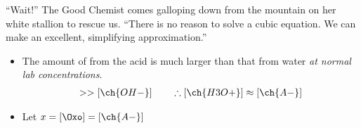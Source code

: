\documentclass[11pt,letterpaper]{article}
\begin{document}
\begin{frame}[t]{``Wait!''}
	The Good Chemist comes galloping down from the mountain on her white
	stallion to rescue us. ``There is no reason to solve a cubic equation.
	We can make an excellent, simplifying approximation.''

	\begin{itemize}
		\item The amount of  from the acid is much larger than
			that from water \emph{at normal lab concentrations}.
			\begin{align*}
				[\ch{A-}] >> [\ch{OH-}] \qquad\therefore [\ch{H3O+}]
				\approx [\ch{A-}]
			\end{align*}
		\item Let $x = [\Oxo] = [\ch{A-}]$
	\end{itemize}


\end{frame}
\end{document}
